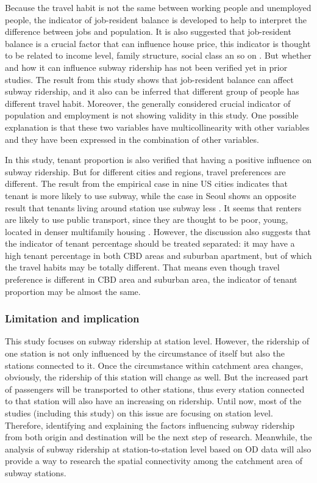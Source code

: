 %
Because the travel habit is not the same between working people and unemployed people, the indicator of job-resident balance is developed to help to interpret the difference between jobs and population. It is also suggested that job-resident balance is a crucial factor that can influence house price, this indicator is thought to be related to income level, family structure, social class an so on \cite{song2004measuring}. But whether and how it can influence subway ridership has not been verified yet in prior studies. The result from this study shows that job-resident balance can affect subway ridership, and it also can be inferred that different group of people has different travel habit. Moreover, the generally considered crucial indicator of population and employment is not showing validity in this study. One possible explanation is that these two variables have multicollinearity with other variables and they have been expressed in the combination of other variables.

%
In this study, tenant proportion is also verified that having a positive influence on subway ridership. But for different cities and regions, travel preferences are different. The result from the empirical case in nine US cities indicates that tenant is more likely to use subway, while the case in Seoul shows an opposite result that tenants living around station use subway less \cite{jun2015land,kuby2004factors}. It seems that renters are likely to use public transport, since they are thought to be poor, young, located in denser multifamily housing \cite{kuby2004factors}. However, the discussion also suggests that the indicator of tenant percentage should be treated separated: it may have a high tenant percentage in both CBD areas and suburban apartment, but of which the travel habits may be totally different. That means even though travel preference is different in CBD area and suburban area, the indicator of tenant proportion may be almost the same.

%
\subsubsection{Limitation and implication}
%
This study focuses on subway ridership at station level. However, the ridership of one station is not only influenced by the circumstance of itself but also the stations connected to it. Once the circumstance within catchment area changes, obviously, the ridership of this station will change as well. But the increased part of passengers will be transported to other stations, thus every station connected to that station will also have an increasing on ridership. Until now, most of the studies (including this study) on this issue are focusing on station level. Therefore, identifying and explaining the factors influencing subway ridership from both origin and destination will be the next step of research. Meanwhile, the analysis of subway ridership at station-to-station level based on OD data will also provide a way to research the spatial connectivity among the catchment area of subway stations.

